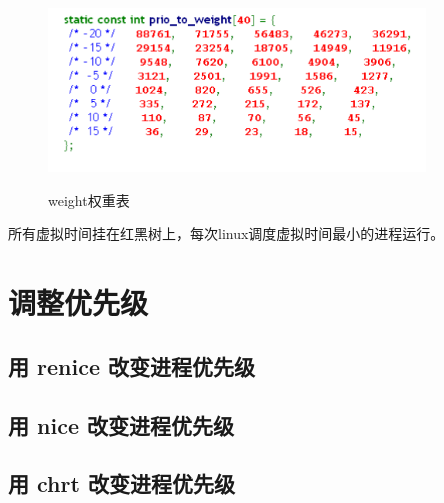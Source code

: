 \begin{figure}[H]
 \wdfigbox
  {\caption{weight权重表}\label{cfs_weight}}
  {
  \includegraphics[width=10cm]{./figure/cfs_weight.png}
  }
\end{figure}

所有虚拟时间挂在红黑树上，每次linux调度虚拟时间最小的进程运行。

\chapter{调整优先级}
\section{用 renice 改变进程优先级}
\section{用 nice 改变进程优先级}
\section{用 chrt 改变进程优先级}
\clearpage
